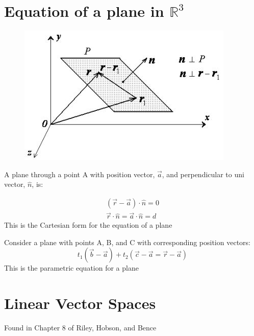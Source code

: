 \documentclass[a4paper, 11pt, normalem]{report}
\begin{document}
\section{Equation of a plane in $\mathbb{R}^3$}
\begin{figure}
    \vspace{-20pt}
    \begin{center}
        \includegraphics[scale=0.6]{Plane.jpg}
    \end{center}
    \vspace{-80pt}
\end{figure}
A plane through a point A with position vector, $\vec{a}$, and perpendicular to uni vector, $\hat{n}$, is:

\begin{gather*}
    (\vec{r} - \vec{a}) \cdot \hat{n} = 0 \\
    \vec{r} \cdot \hat{n} = \vec{a} \cdot \hat{n} = d
\end{gather*}
This is the Cartesian form for the equation of a plane

Consider a plane with points A, B, and C with corresponding position vectors:
\begin{equation*}
    t_{1}(\vec{b} - \vec{a}) + t_{2}(\vec{c} - \vec{a} = \vec{r} - \vec{a})
\end{equation*}
This is the parametric equation for a plane

\section{Linear Vector Spaces}
Found in Chapter 8 of Riley, Hobson, and Bence
\end{document}
